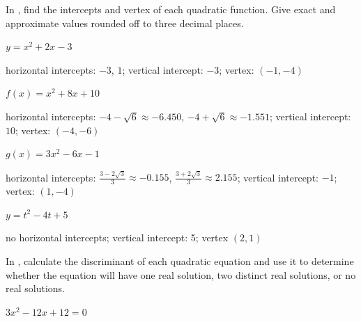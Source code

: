 \noindent In , find the intercepts and vertex of each quadratic function. Give exact and approximate values rounded off to three decimal places.


\begin{exercise}\label{exercise-3.4.7}
$y=x^2+2x-3$
\end{exercise}


\begin{solution}
    horizontal intercepts: $-3$, $1$; vertical intercept: $-3$; vertex: $(-1,-4)$
\end{solution}



\begin{exercise}
$f(x)=x^2+8x+10$
\end{exercise}

\begin{solution}
    horizontal intercepts: $-4-\sqrt{6}\approx-6.450$, $-4+\sqrt{6}\approx-1.551$; vertical intercept: $10$; vertex: $(-4,-6)$
\end{solution}



\begin{exercise}
$g(x)=3x^2-6x-1$
\end{exercise}

\begin{solution}
     horizontal intercepts: $\frac{3-2\sqrt{3}}{3}\approx-0.155$, $\frac{3+2\sqrt{3}}{3}\approx2.155$; vertical intercept: $-1$; vertex: $(1,-4)$
\end{solution}



\begin{exercise}\label{exercise-3.4.10}
$y=t^2-4t+5$
\end{exercise}

\begin{solution}
     no horizontal intercepts; vertical intercept: 5; vertex $(2,1)$
\end{solution}






\noindent In  , calculate the discriminant of each quadratic equation and use it to determine whether the equation will have one real solution, two distinct real solutions, or no real solutions.


\begin{exercise}\label{exercise-3.4.11}
$3x^2-12x+12=0$
\end{exercise}

